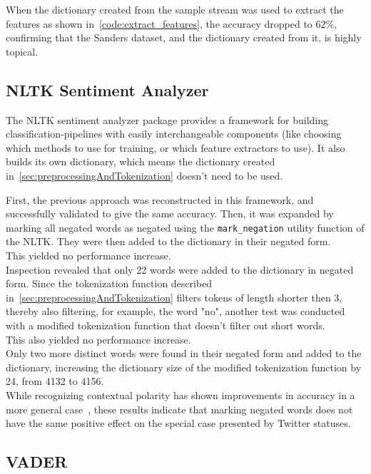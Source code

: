 When the dictionary created from the sample stream was used to extract the features as shown in~\ref{code:extract_features},
the accuracy dropped to $62\%$, confirming that the Sanders dataset, and the dictionary created from it, is highly topical.

\subsection{NLTK Sentiment Analyzer}
\label{subsec:nltksentimentanalyzer}

The NLTK sentiment analyzer package provides a framework for building classification-pipelines with easily interchangeable components
(like choosing which methods to use for training, or which feature extractors to use).
It also builds its own dictionary, which means the dictionary created in~\ref{sec:preprocessingAndTokenization} doesn't need to be used.
\par
First, the previous approach was reconstructed in this framework, and successfully validated to give the same accuracy.
Then, it was expanded by marking all negated words as negated using the \texttt{mark_negation} utility function of the NLTK.
They were then added to the dictionary in their negated form.
\\
This yielded no performance increase.
\\
Inspection revealed that only 22 words were added to the dictionary in negated form.
Since the tokenization function described in~\ref{sec:preprocessingAndTokenization} filters tokens of length shorter then 3,
thereby also filtering, for example, the word "no", another test was conducted with a modified tokenization function that doesn't filter out short words.
\\
This also yielded no performance increase.
\\
Only two more distinct words were found in their negated form and added to the dictionary,
increasing the dictionary size of the modified tokenization function by 24, from 4132 to 4156.
\\
While recognizing contextual polarity has shown improvements in accuracy in a more general case~\cite{Hoffmann2005},
these results indicate that marking negated words does not have the same positive effect on the special case presented by Twitter statuses.

\subsection{VADER}
\label{subsec:vader}

